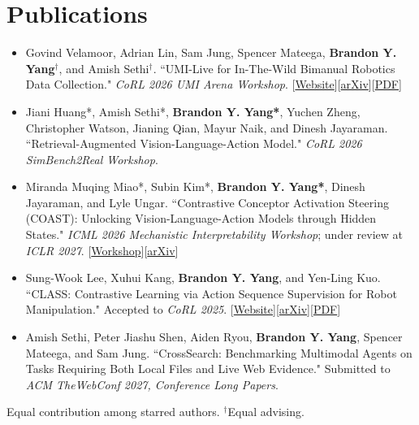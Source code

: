 \documentclass[letterpaper,11pt]{article}
\newcommand{\linkhref}[2]{\textcolor{linkblue}{\href{#1}{#2}}}
\begin{document}
\section{Publications}
\begin{itemize}[label={}, leftmargin=0pt, parsep=0pt, itemsep=2pt]
    \item Govind Velamoor, Adrian Lin, Sam Jung, Spencer Mateega, \textbf{Brandon Y. Yang}$^{\dagger}$, and Amish Sethi$^{\dagger}$. ``UMI-Live for In-The-Wild Bimanual Robotics Data Collection." \textit{CoRL 2026 UMI Arena Workshop}. \hfill [\linkhref{https://umi-live.github.io/}{Website}][\linkhref{https://arxiv.org/abs/2610.39385}{arXiv}][\linkhref{https://arxiv.org/pdf/2610.39385}{PDF}]
    \item Jiani Huang*, Amish Sethi*, \textbf{Brandon Y. Yang*}, Yuchen Zheng, Christopher Watson, Jianing Qian, Mayur Naik, and Dinesh Jayaraman. ``Retrieval-Augmented Vision-Language-Action Model." \textit{CoRL 2026 SimBench2Real Workshop}.
    \item Miranda Muqing Miao*, Subin Kim*, \textbf{Brandon Y. Yang*}, Dinesh Jayaraman, and Lyle Ungar. ``Contrastive Conceptor Activation Steering (COAST): Unlocking Vision-Language-Action Models through Hidden States." \textit{ICML 2026 Mechanistic Interpretability Workshop}; under review at \textit{ICLR 2027}. \hfill [\linkhref{https://mechinterpworkshop.com/posters/}{Workshop}][\linkhref{https://arxiv.org/abs/2605.17144}{arXiv}]
    \item Sung-Wook Lee, Xuhui Kang, \textbf{Brandon Y. Yang}, and Yen-Ling Kuo. ``CLASS: Contrastive Learning via Action Sequence Supervision for Robot Manipulation." Accepted to \textit{CoRL 2025}. \hfill [\linkhref{https://class-robot.github.io/}{Website}][\linkhref{https://arxiv.org/abs/2508.01600}{arXiv}][\linkhref{https://arxiv.org/pdf/2508.01600}{PDF}]
    \item Amish Sethi, Peter Jiashu Shen, Aiden Ryou, \textbf{Brandon Y. Yang}, Spencer Mateega, and Sam Jung. ``CrossSearch: Benchmarking Multimodal Agents on Tasks Requiring Both Local Files and Live Web Evidence." Submitted to \textit{ACM TheWebConf 2027, Conference Long Papers}.
\end{itemize}
{\footnotesize *Equal contribution among starred authors. $^{\dagger}$Equal advising.}
\end{document}
